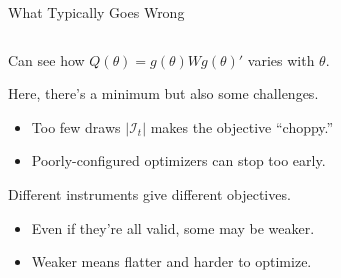 \documentclass[aspectratio=169,t,11pt,table]{beamer}
\begin{document}
\begin{frame}{What Typically Goes Wrong}
    \begin{columns}
        \begin{column}{0.65\textwidth}
            \begin{wideitemize}
                \item<2-> Can see how $Q(\theta) = g(\theta)Wg(\theta)'$ varies with $\theta$.
                \item<3-> Here, there's a minimum but also some challenges.
                \begin{itemize}
                    \item<4-> \alert{Too few draws} $|\mathcal{I}_t|$ makes the objective ``choppy.''
                    \item<5-> \alert{Poorly-configured optimizers} can stop too early.
                \end{itemize}
                \item<6-> Different instruments give different objectives.
                \begin{itemize}
                    \item<7-> Even if they're all valid, some may be weaker.
                    \item<7-> Weaker means flatter and harder to optimize.
                \end{itemize}
            \end{wideitemize}
        \end{column}
        \begin{column}{0.35\textwidth}
            \vspace{0.5\baselineskip}

\end{column}
\end{columns}
\end{frame}
\end{document}
